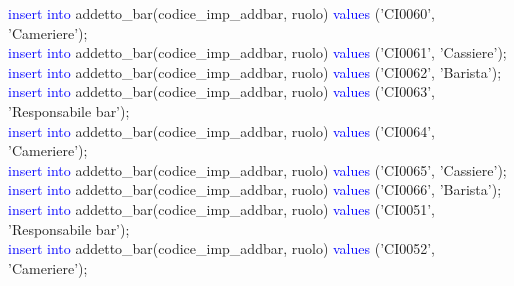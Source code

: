 \documentclass{article}
\begin{document}
\begin{flushleft}
{        \hspace*{0.5em}\textcolor{blue}{insert into} addetto\_bar(codice\_imp\_addbar, ruolo) \textcolor{blue}{values} ('CI0060', 'Cameriere'); \\
        \hspace*{0.5em}\textcolor{blue}{insert into} addetto\_bar(codice\_imp\_addbar, ruolo) \textcolor{blue}{values} ('CI0061', 'Cassiere'); \\
        \hspace*{0.5em}\textcolor{blue}{insert into} addetto\_bar(codice\_imp\_addbar, ruolo) \textcolor{blue}{values} ('CI0062', 'Barista'); \\
        \hspace*{0.5em}\textcolor{blue}{insert into} addetto\_bar(codice\_imp\_addbar, ruolo) \textcolor{blue}{values} ('CI0063', 'Responsabile \hspace*{0.5em}bar'); \\
        \hspace*{0.5em}\textcolor{blue}{insert into} addetto\_bar(codice\_imp\_addbar, ruolo) \textcolor{blue}{values} ('CI0064', 'Cameriere'); \\
        \hspace*{0.5em}\textcolor{blue}{insert into} addetto\_bar(codice\_imp\_addbar, ruolo) \textcolor{blue}{values} ('CI0065', 'Cassiere'); \\
        \hspace*{0.5em}\textcolor{blue}{insert into} addetto\_bar(codice\_imp\_addbar, ruolo) \textcolor{blue}{values} ('CI0066', 'Barista'); \\
        \hspace*{0.5em}\textcolor{blue}{insert into} addetto\_bar(codice\_imp\_addbar, ruolo) \textcolor{blue}{values} ('CI0051', 'Responsabile \hspace*{0.5em}bar'); \\
        \hspace*{0.5em}\textcolor{blue}{insert into} addetto\_bar(codice\_imp\_addbar, ruolo) \textcolor{blue}{values} ('CI0052', 'Cameriere'); \\}
    \end{flushleft}
\end{document}
